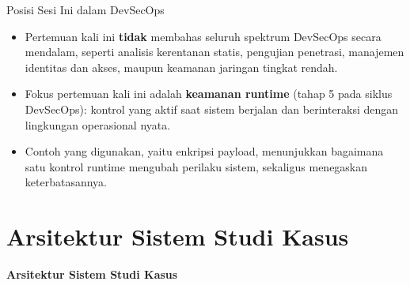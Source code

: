 \documentclass[aspectratio=169, table]{beamer}
\begin{document}
\begin{frame}{Posisi Sesi Ini dalam DevSecOps}
	\vspace{10pt}
	\begin{itemize}
		\item Pertemuan kali ini \textbf{tidak} membahas seluruh spektrum DevSecOps secara mendalam,
		      seperti analisis kerentanan statis, pengujian penetrasi,
		      manajemen identitas dan akses, maupun keamanan jaringan tingkat rendah.
		\item Fokus pertemuan kali ini adalah \textbf{keamanan runtime} (tahap 5 pada siklus DevSecOps):
		      kontrol yang aktif saat sistem berjalan dan berinteraksi dengan lingkungan operasional nyata.
		\item Contoh yang digunakan, yaitu enkripsi payload,
		      menunjukkan bagaimana satu kontrol runtime mengubah perilaku sistem,
		      sekaligus menegaskan keterbatasannya.
	\end{itemize}
\end{frame}

\section{Arsitektur Sistem Studi Kasus}

	\begin{frame}{\hfill}
		\centering
		\Huge{\textbf{Arsitektur Sistem Studi Kasus}}
	\end{frame}
\end{document}
